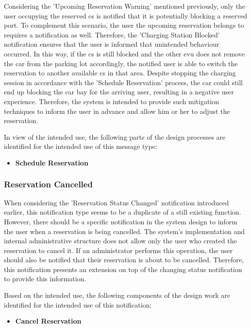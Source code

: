 Considering the 'Upcoming Reservation Warning' mentioned previously, only the user occupying the reserved \acrshort{cs} is notified that it is potentially blocking a reserved port. To complement this scenario, the user the upcoming reservation belongs to requires a notification as well.
Therefore, the 'Charging Station Blocked' notification ensures that the user is informed that unintended behaviour occurred. In this way, if the \acrshort{cs} is still blocked and the other \acrshort{evu} does not remove the car from the parking lot accordingly, the notified user is able to switch the reservation to another available \acrshort{cs} in that area.
Despite stopping the charging session in accordance with the 'Schedule Reservation' process, the car could still end up blocking the car bay for the arriving user, resulting in a negative user experience. Therefore, the system is intended to provide such mitigation techniques to inform the user in advance and allow him or her to adjust the reservation.

\noindent In view of the intended use, the following parts of the design processes are identified for the intended use of this message type:
\begin{itemize}
    \item \textbf{Schedule Reservation}
\end{itemize}

\subsubsection{Reservation Cancelled}
\label{ch:Design:sec:Reservation System:ssec:Notification Capabilities:sssec:Reservation Cancelled}

When considering the 'Reservation Status Changed' notification introduced earlier, this notification type seems to be a duplicate of a still existing function.
However, there should be a specific notification in the system design to inform the user when a reservation is being cancelled. The system's implementation and internal administrative structure does not allow only the user who created the reservation to cancel it. 
If an administrator performs this operation, the user should also be notified that their reservation is about to be cancelled. 
Therefore, this notification presents an extension on top of the changing status notification to provide this information.

\noindent Based on the intended use, the following components of the design work are identified for the intended use of this notification:
\begin{itemize}
    \item \textbf{Cancel Reservation}
\end{itemize}

